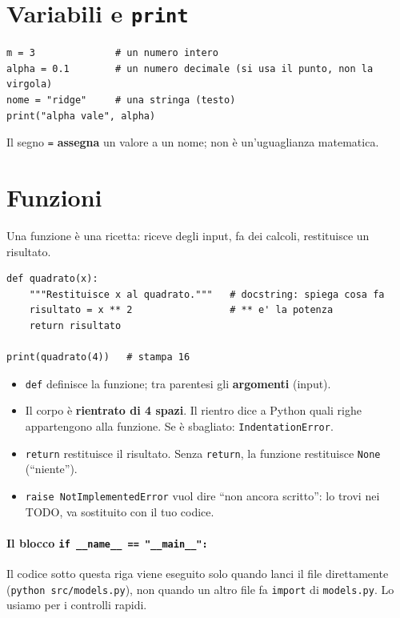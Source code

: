 \documentclass[11pt,a4paper]{article}
\begin{document}
\section{Variabili e \texttt{print}}
\begin{lstlisting}
m = 3              # un numero intero
alpha = 0.1        # un numero decimale (si usa il punto, non la virgola)
nome = "ridge"     # una stringa (testo)
print("alpha vale", alpha)
\end{lstlisting}
Il segno \texttt{=} \textbf{assegna} un valore a un nome; non è un'uguaglianza matematica.

\section{Funzioni}
Una funzione è una ricetta: riceve degli input, fa dei calcoli, restituisce un risultato.
\begin{lstlisting}
def quadrato(x):
    """Restituisce x al quadrato."""   # docstring: spiega cosa fa
    risultato = x ** 2                 # ** e' la potenza
    return risultato

print(quadrato(4))   # stampa 16
\end{lstlisting}
\begin{itemize}
  \item \texttt{def} definisce la funzione; tra parentesi gli \textbf{argomenti} (input).
  \item Il corpo è \textbf{rientrato di 4 spazi}. Il rientro dice a Python quali righe appartengono alla funzione.
        Se è sbagliato: \texttt{IndentationError}.
  \item \texttt{return} restituisce il risultato. Senza \texttt{return}, la funzione restituisce \texttt{None} (``niente'').
  \item \texttt{raise NotImplementedError} vuol dire ``non ancora scritto'': lo trovi nei TODO, va sostituito con il tuo codice.
\end{itemize}

\paragraph{Il blocco \texttt{if \_\_name\_\_ == "\_\_main\_\_":}}
Il codice sotto questa riga viene eseguito solo quando lanci il file direttamente (\texttt{python src/models.py}),
non quando un altro file fa \texttt{import} di \texttt{models.py}. Lo usiamo per i controlli rapidi.
\end{document}
